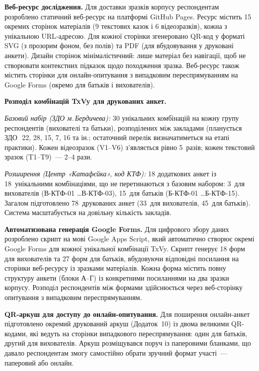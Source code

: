 \documentclass[14pt, a4paper]{extreport}
\begin{document}
\vspace{8pt}
\textbf{Веб-ресурс дослідження.}
Для доставки зразків корпусу респондентам розроблено статичний веб-ресурс на платформі GitHub Pages. Ресурс містить 15 окремих сторінок матеріалів (9 текстових казок і 6 відеозразків), кожна з унікальною URL-адресою. Для кожної сторінки згенеровано QR-код у форматі SVG (з прозорим фоном, без полів) та PDF (для вбудовування у друковані анкети). Дизайн сторінок мінімалістичний: лише матеріал без навігації, щоб не створювати контекстних підказок щодо походження зразка. Веб-ресурс також містить сторінки для онлайн-опитування з випадковим переспрямуванням на Google Forms (окремо для батьків і вихователів).

\vspace{8pt}
\textbf{Розподіл комбінацій TxVy для друкованих анкет.}

{\small
\textit{Базовий набір (ЗДО м.\,Бердичева):} 30 унікальних комбінацій на кожну групу респондентів (вихователі та батьки), розподілених між закладами (планується ЗДО~\textnumero\textnumero\,22, 28, 15, 7, 16 та ін.; остаточний перелік визначатиметься на етапі практики). Кожен відеозразок (V1--V6) з'являється рівно 5~разів; кожен текстовий зразок (T1--T9)~--- 2--4 рази.

\textit{Розширення (Центр «Катафєйка», код КТФ):} 18 додаткових анкет із 18~унікальними комбінаціями, що не перетинаються з базовим набором: 3~для вихователів (В-КТФ-01 \ldots В-КТФ-03), 15~для батьків (Б-КТФ-01 \ldots Б-КТФ-15). Загалом підготовлено 78~друкованих анкет (33~для вихователів, 45~для батьків). Система масштабується на довільну кількість закладів.
}

\vspace{8pt}
\textbf{Автоматизована генерація Google Forms.}
Для цифрового збору даних розроблено скрипт на мові Google Apps Script, який автоматично створює окремі Google Forms для кожної унікальної комбінації TxVy. Скрипт генерує 18 форм для вихователів та 27 форм для батьків, вбудовуючи відповідні посилання на сторінки веб-ресурсу із зразками матеріалів. Кожна форма містить повну структуру анкети (блоки А--Г) із конкретними посиланнями на два зразки корпусу. Розподіл респондентів між формами здійснюється через веб-сторінку опитування з випадковим переспрямуванням.

\vspace{8pt}
\textbf{QR-аркуш для доступу до онлайн-опитування.}
Для поширення онлайн-анкет підготовлено окремий друкований аркуш (Додаток~10) із двома великими QR-кодами, які ведуть на сторінки випадкового переспрямування: один для батьків, другий для вихователів. Аркуш розміщувався поруч із паперовими бланками, що давало респондентам змогу самостійно обрати зручний формат участі~--- паперовий або онлайн.
\end{document}
